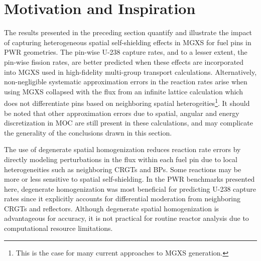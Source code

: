 \section{Motivation and Inspiration}
\label{sec:chap8-motivate-inspire}

The results presented in the preceding section quantify and illustrate the impact of capturing heterogeneous spatial self-shielding effects in \ac{MGXS} for fuel pins in \ac{PWR} geometries. The pin-wise U-238 capture rates, and to a lesser extent, the pin-wise fission rates, are better predicted when these effects are incorporated into \ac{MGXS} used in high-fidelity multi-group transport calculations. Alternatively, non-negligible systematic approximation errors in the reaction rates arise when using \ac{MGXS} collapsed with the flux from an infinite lattice calculation which does not differentiate pins based on neighboring spatial heterogeities\footnote{This is the case for many current approaches to \ac{MGXS} generation.}. It should be noted that other approximation errors due to spatial, angular and energy discretization in \ac{MOC} are still present in these calculations, and may complicate the generality of the conclusions drawn in this section.

The use of degenerate spatial homogenization reduces reaction rate errors by directly modeling perturbations in the flux within each fuel pin due to local heterogeneities such as neighboring \acp{CRGT} and \acp{BP}. Some reactions may be more or less sensitive to spatial self-shielding. In the \ac{PWR} benchmarks presented here, degenerate homogenization was most beneficial for predicting U-238 capture rates since it explicitly accounts for differential moderation from neighboring \acp{CRGT} and reflectors. Although degenerate spatial homogenization is advantageous for accuracy, it is not practical for routine reactor analysis due to computational resource limitations.

